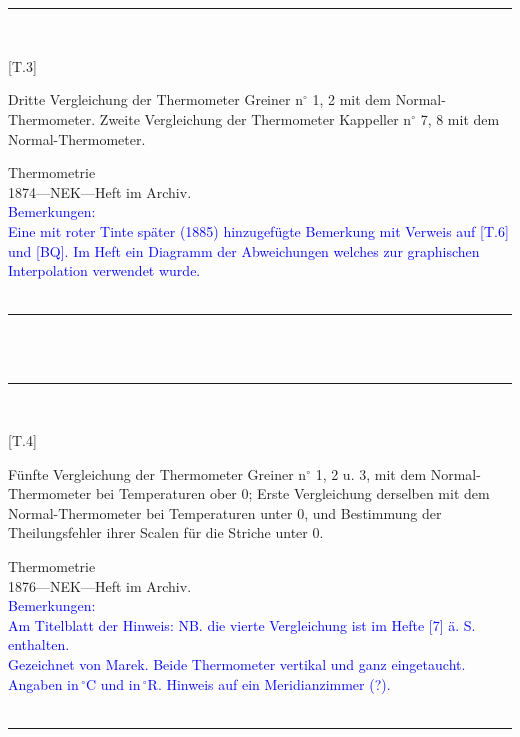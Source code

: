 \\
\vspace*{-2.5pt}\\
\parbox{\textwidth}{%
\rule{\textwidth}{1pt}\vspace*{-3mm}\\
\begin{minipage}[t]{0.2\textwidth}\vspace{0pt}
\Huge\rule[-4mm]{0cm}{1cm}[T.3]
\end{minipage}
\hfill
\begin{minipage}[t]{0.8\textwidth}\vspace{0pt}
\large Dritte Vergleichung der Thermometer Greiner n{$^\circ$} 1, 2 mit dem Normal-Thermometer. Zweite Vergleichung der Thermometer Kappeller n{$^\circ$} 7, 8 mit dem Normal-Thermometer.\rule[-2mm]{0mm}{2mm}
\end{minipage}
{\footnotesize\flushright
Thermometrie\\
}
1874\quad---\quad NEK\quad---\quad Heft im Archiv.\\
\textcolor{blue}{Bemerkungen:\\{}
Eine mit roter Tinte später (1885) hinzugefügte Bemerkung mit Verweis auf [T.6] und [BQ]. Im Heft ein Diagramm der Abweichungen welches zur graphischen Interpolation verwendet wurde.\\{}
}
\\[-15pt]
\rule{\textwidth}{1pt}
}
\\
\vspace*{-2.5pt}\\
\parbox{\textwidth}{%
\rule{\textwidth}{1pt}\vspace*{-3mm}\\
\begin{minipage}[t]{0.2\textwidth}\vspace{0pt}
\Huge\rule[-4mm]{0cm}{1cm}[T.4]
\end{minipage}
\hfill
\begin{minipage}[t]{0.8\textwidth}\vspace{0pt}
\large Fünfte Vergleichung der Thermometer Greiner n{$^\circ$} 1, 2 u. 3, mit dem Normal-Thermometer bei Temperaturen ober 0; Erste Vergleichung derselben mit dem Normal-Thermometer bei Temperaturen unter 0, und Bestimmung der Theilungsfehler ihrer Scalen für die Striche unter 0.\rule[-2mm]{0mm}{2mm}
\end{minipage}
{\footnotesize\flushright
Thermometrie\\
}
1876\quad---\quad NEK\quad---\quad Heft im Archiv.\\
\textcolor{blue}{Bemerkungen:\\{}
Am Titelblatt der Hinweis: {\glqq}NB. die vierte Vergleichung ist im Hefte [7] ä. S. enthalten.{\grqq}\\{}
Gezeichnet von Marek. Beide Thermometer vertikal und ganz eingetaucht. Angaben in\,{$^\circ$}C und in\,{$^\circ$}R. Hinweis auf ein {\glqq}Meridianzimmer{\grqq} (?).\\{}
}
\\[-15pt]
\rule{\textwidth}{1pt}
}
